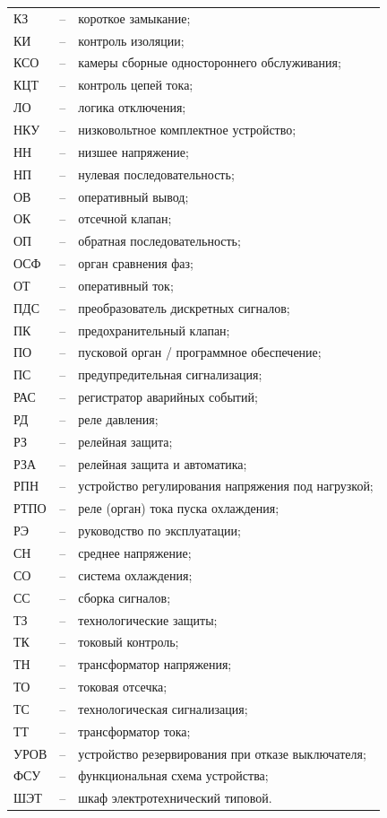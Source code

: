 \documentclass[a4paper, 12pt,table, hidelinks, DIV=calc]{extarticle} %
\begin{document}
\begin{longtable}{>{\raggedright\arraybackslash}m{2cm}>{\raggedright\arraybackslash}m{0.5cm}>{\raggedright\arraybackslash}m{20cm}}
КЗ & -- & короткое замыкание; \\
КИ & -- & контроль изоляции; \\
КСО & -- & камеры сборные одностороннего обслуживания; \\
КЦТ & -- & контроль цепей тока; \\
ЛО & -- & логика отключения; \\
НКУ & -- & низковольтное комплектное устройство; \\
НН & -- & низшее напряжение; \\
НП & -- & нулевая последовательность; \\
ОВ & -- & оперативный вывод; \\
ОК & -- & отсечной клапан; \\
ОП & -- & обратная последовательность; \\
ОСФ & -- & орган сравнения фаз; \\
ОТ & -- & оперативный ток; \\
ПДС & -- & преобразователь дискретных сигналов; \\
ПК & -- & предохранительный клапан; \\
ПО & -- & пусковой орган / программное обеспечение; \\
ПС & -- & предупредительная сигнализация; \\
РАС & -- & регистратор аварийных событий; \\
РД & -- & реле давления; \\
РЗ & -- & релейная защита; \\
РЗА & -- & релейная защита и автоматика; \\
РПН & -- & устройство регулирования напряжения под нагрузкой; \\
РТПО & -- & реле (орган) тока пуска охлаждения; \\
РЭ & -- & руководство по эксплуатации; \\
СН & -- & среднее напряжение; \\
СО & -- & система охлаждения; \\
СС & -- & сборка сигналов; \\
ТЗ & -- & технологические защиты; \\
ТК & -- & токовый контроль; \\
ТН & -- & трансформатор напряжения; \\
ТО & -- & токовая отсечка; \\
ТС & -- & технологическая сигнализация; \\
ТТ & -- & трансформатор тока; \\
УРОВ & -- & устройство резервирования при отказе выключателя; \\
ФСУ & -- & функциональная схема устройства; \\
ШЭТ & -- & шкаф электротехнический типовой. \\
\end{longtable}\newpage
\end{document}

